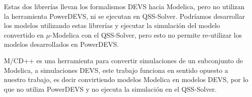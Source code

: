 Estas dos librerías llevan los formalismos DEVS hacia Modelica, pero no utilizan la herramienta PowerDEVS, ni se ejecutan en QSS-Solver.
Podríamos desarrollar los modelos utilizando estas librerías y ejecutar la simulación del modelo convertido en $\mu$-Modelica con el QSS-Solver, pero esto no permite re-utilizar los modelos desarrollados en PowerDEVS.


M/CD++ \cite{DAbreuW05} es una herramienta para convertir simulaciones de un subconjunto de Modelica, a simulaciones DEVS, este trabajo funciona en sentido opuesto a nuestro trabajo, es decir convirtiendo modelos Modelica en modelos DEVS, por lo que no utiliza PowerDEVS y no ejecuta la simulación en el QSS-Solver.

